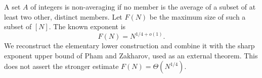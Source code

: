 A set $A$ of integers is non-averaging if no member is the average
of a subset of at least two other, distinct members. Let $F(N)$ be the
maximum size of such a subset of $[N]$. The known exponent is
\[
 F(N)=N^{1/4+o(1)}.
\]
We reconstruct the elementary lower construction and combine it with
the sharp exponent upper bound of Pham and Zakharov, used as an external
theorem. This does not assert the stronger estimate $F(N)=\Theta(N^{1/4})$.
